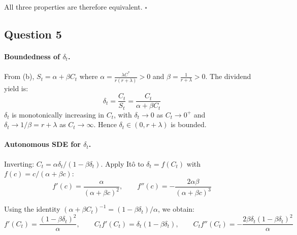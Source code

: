 \documentclass[12pt,a4paper]{article}
\begin{document}
All three properties are therefore equivalent. $\square$

\subsection*{Question 5}

\paragraph{Boundedness of $\delta_t$.}
From (b), $S_t = \alpha + \beta C_t$ where $\alpha = \frac{\lambda C^*}{r(r+\lambda)} > 0$ and $\beta = \frac{1}{r+\lambda} > 0$. The dividend yield is:
\begin{equation*}
    \delta_t = \frac{C_t}{S_t} = \frac{C_t}{\alpha + \beta C_t}
\end{equation*}
$\delta_t$ is monotonically increasing in $C_t$, with $\delta_t \to 0$ as $C_t \to 0^+$ and $\delta_t \to 1/\beta = r+\lambda$ as $C_t \to \infty$. Hence $\delta_t \in (0, r+\lambda)$ is bounded.

\paragraph{Autonomous SDE for $\delta_t$.}
Inverting: $C_t = \alpha\delta_t/(1 - \beta\delta_t)$. Apply Itô to $\delta_t = f(C_t)$ with $f(c) = c/(\alpha + \beta c)$:
\begin{equation*}
    f'(c) = \frac{\alpha}{(\alpha + \beta c)^2}, \qquad f''(c) = -\frac{2\alpha\beta}{(\alpha + \beta c)^3}
\end{equation*}

Using the identity $(\alpha + \beta C_t)^{-1} = (1 - \beta\delta_t)/\alpha$, we obtain:
\begin{equation*}
    f'(C_t) = \frac{(1-\beta\delta_t)^2}{\alpha}, \qquad C_t f'(C_t) = \delta_t(1-\beta\delta_t), \qquad C_t f''(C_t) = -\frac{2\beta\delta_t(1-\beta\delta_t)^2}{\alpha}
\end{equation*}
\end{document}
